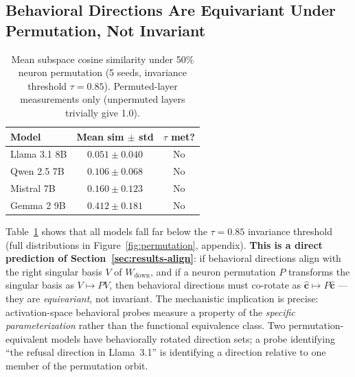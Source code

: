 \documentclass{article}
\newcommand{\ch}{\hat{\mathbf{c}}}
\newcommand{\Wdn}{W_{\!\mathrm{down}}}
\begin{document}
\begin{table}[h]
\centering
\caption{Raw-activation control: mean $\Wdn$ alignment ratios, averaged over layers
25--75\% depth and all five behaviors. Behavioral advantage = Behavioral PC1 $-$ Raw PC1.}
\label{tab:rawcontrol}
\vskip 0.05in
\end{table}

\subsection{Behavioral Directions Are Equivariant Under Permutation, Not Invariant}
\label{sec:results-perm}

\begin{table}[h]
\centering
\caption{Mean subspace cosine similarity under 50\% neuron permutation (5 seeds,
invariance threshold $\tau{=}0.85$). Permuted-layer measurements only (unpermuted layers
trivially give 1.0).}
\label{tab:perm}
\vskip 0.05in
\begin{tabular}{lcc}
\toprule
Model & Mean sim $\pm$ std & $\tau$ met? \\
\midrule
Llama 3.1 8B & $0.051 \pm 0.040$ & No \\
Qwen 2.5 7B  & $0.106 \pm 0.068$ & No \\
Mistral 7B   & $0.160 \pm 0.123$ & No \\
Gemma 2 9B   & $0.412 \pm 0.181$ & No \\
\bottomrule
\end{tabular}
\end{table}

Table~\ref{tab:perm} shows that all models fall far below the $\tau{=}0.85$
invariance threshold (full distributions in Figure~\ref{fig:permutation}, appendix).
\textbf{This is a direct prediction of Section~\ref{sec:results-align}}: if behavioral
directions align with the right singular basis $V$ of $\Wdn$, and if a neuron
permutation $P$ transforms the singular basis as $V \mapsto PV$, then behavioral
directions must co-rotate as $\ch \mapsto P\ch$ — they are \emph{equivariant}, not
invariant.
The mechanistic implication is precise: activation-space behavioral probes measure a
property of the \emph{specific parameterization} rather than the functional equivalence
class.
Two permutation-equivalent models have behaviorally rotated direction sets; a probe
identifying ``the refusal direction in Llama~3.1'' is identifying a direction relative to
one member of the permutation orbit.
\end{document}
